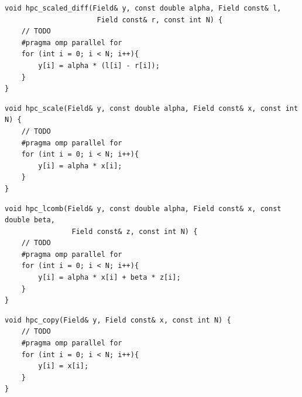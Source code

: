 \documentclass[unicode,11pt,a4paper,oneside,numbers=endperiod,openany]{scrartcl}
\begin{document}
\begin{lstlisting}[language=MyC++, style=mystyle, caption={HPC Scaled Difference Function with Parallelization}]
void hpc_scaled_diff(Field& y, const double alpha, Field const& l,
                      Field const& r, const int N) {
    // TODO
    #pragma omp parallel for
    for (int i = 0; i < N; i++){
        y[i] = alpha * (l[i] - r[i]);
    }
}
\end{lstlisting}
\begin{lstlisting}[language=MyC++, style=mystyle, caption={HPC Scale Function with Parallelization}]
void hpc_scale(Field& y, const double alpha, Field const& x, const int N) {
    // TODO
    #pragma omp parallel for
    for (int i = 0; i < N; i++){
        y[i] = alpha * x[i];
    }
}
\end{lstlisting}
\begin{lstlisting}[language=MyC++, style=mystyle, caption={HPC Linear Combination Function with Parallelization}]
void hpc_lcomb(Field& y, const double alpha, Field const& x, const double beta,
                Field const& z, const int N) {
    // TODO
    #pragma omp parallel for
    for (int i = 0; i < N; i++){
        y[i] = alpha * x[i] + beta * z[i];
    }
}
\end{lstlisting}
\begin{lstlisting}[language=MyC++, style=mystyle, caption={HPC Copy Function with Parallelization}]
void hpc_copy(Field& y, Field const& x, const int N) {
    // TODO
    #pragma omp parallel for
    for (int i = 0; i < N; i++){
        y[i] = x[i];
    }
}
\end{lstlisting}
\end{document}
